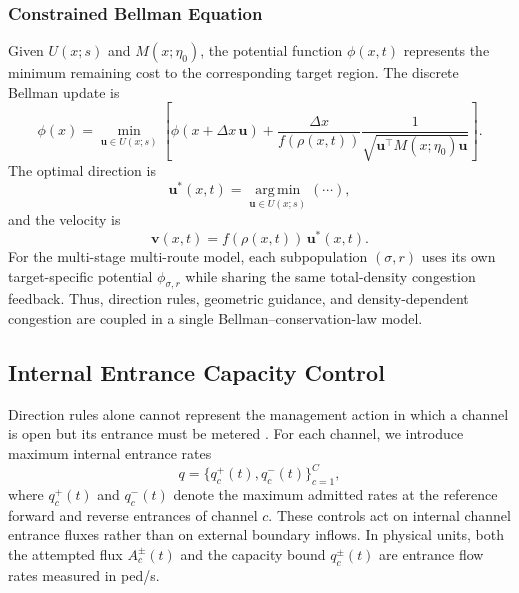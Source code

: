 \documentclass[lettersize,journal]{IEEEtran}
\begin{document}
\subsubsection{Constrained Bellman Equation}

Given $U(x;s)$ and $M(x;\eta_0)$, the potential function $\phi(x,t)$ represents the minimum remaining cost to the corresponding target region.
The discrete Bellman update is
\begin{equation}
\phi(x)=
\min_{\mathbf u\in U(x;s)}
\left[
\phi(x+\Delta x\,\mathbf u)
+\frac{\Delta x}{f(\rho(x,t))}
\frac{1}{\sqrt{\mathbf u^\top M(x;\eta_0)\mathbf u}}
\right].
\label{eq:bellman}
\end{equation}
The optimal direction is
\begin{equation}
\mathbf u^*(x,t)=\operatorname*{arg\,min}_{\mathbf u\in U(x;s)}(\cdots),
\label{eq:optimal_direction}
\end{equation}
and the velocity is
\begin{equation}
\mathbf v(x,t)=f(\rho(x,t))\,\mathbf u^*(x,t).
\label{eq:velocity}
\end{equation}
For the multi-stage multi-route model, each subpopulation $(\sigma,r)$ uses its own target-specific potential $\phi_{\sigma,r}$ while sharing the same total-density congestion feedback.
Thus, direction rules, geometric guidance, and density-dependent congestion are coupled in a single Bellman--conservation-law model.

\subsection{Internal Entrance Capacity Control}

Direction rules alone cannot represent the management action in which a channel is open but its entrance must be metered \cite{jiang2018coordinated_inflow,liu2021queuing_network_flow_control,hu2025passenger_capacity_allocation}.
For each channel, we introduce maximum internal entrance rates
\begin{equation}
q=\{q_c^+(t),q_c^-(t)\}_{c=1}^C,
\label{eq:q_control}
\end{equation}
where $q_c^+(t)$ and $q_c^-(t)$ denote the maximum admitted rates at the reference forward and reverse entrances of channel $c$.
These controls act on internal channel entrance fluxes rather than on external boundary inflows.
In physical units, both the attempted flux $A_c^\pm(t)$ and the capacity bound $q_c^\pm(t)$ are entrance flow rates measured in ped/s.
\end{document}

